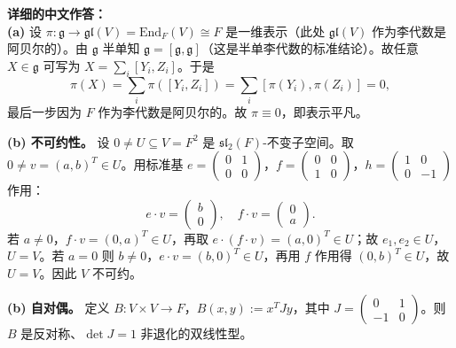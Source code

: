 \documentclass{ctexart}
\begin{document}
\vspace{1em}
\textbf{详细的中文作答：}\\
\textbf{(a)} 设 $\pi: \mathfrak{g} \to \mathfrak{gl}(V) = \mathrm{End}_F(V) \cong F$ 是一维表示（此处 $\mathfrak{gl}(V)$ 作为李代数是阿贝尔的）。由 $\mathfrak{g}$ 半单知 $\mathfrak{g} = [\mathfrak{g}, \mathfrak{g}]$（这是半单李代数的标准结论）。故任意 $X \in \mathfrak{g}$ 可写为 $X = \sum_{i} [Y_i, Z_i]$。于是
\[
\pi(X) = \sum_{i} \pi([Y_i, Z_i]) = \sum_{i} [\pi(Y_i), \pi(Z_i)] = 0,
\]
最后一步因为 $F$ 作为李代数是阿贝尔的。故 $\pi \equiv 0$，即表示平凡。

\textbf{(b) 不可约性。} 设 $0 \neq U \subseteq V = F^{2}$ 是 $\mathfrak{sl}_2(F)$-不变子空间。取 $0 \neq v = (a, b)^{T} \in U$。用标准基 $e = \begin{pmatrix} 0 & 1 \\ 0 & 0 \end{pmatrix}$，$f = \begin{pmatrix} 0 & 0 \\ 1 & 0 \end{pmatrix}$，$h = \begin{pmatrix} 1 & 0 \\ 0 & -1 \end{pmatrix}$ 作用：
\[
e \cdot v = \begin{pmatrix} b \\ 0 \end{pmatrix}, \quad f \cdot v = \begin{pmatrix} 0 \\ a \end{pmatrix}.
\]
若 $a \neq 0$，$f \cdot v = (0, a)^{T} \in U$，再取 $e \cdot (f\cdot v) = (a, 0)^{T} \in U$；故 $e_{1}, e_{2} \in U$，$U = V$。若 $a = 0$ 则 $b \neq 0$，$e \cdot v = (b, 0)^{T} \in U$，再用 $f$ 作用得 $(0, b)^{T} \in U$，故 $U = V$。因此 $V$ 不可约。

\textbf{(b) 自对偶。} 定义 $B: V \times V \to F$，$B(x, y) := x^{T} J y$，其中 $J = \begin{pmatrix} 0 & 1 \\ -1 & 0 \end{pmatrix}$。则 $B$ 是反对称、$\det J = 1$ 非退化的双线性型。
\end{document}
